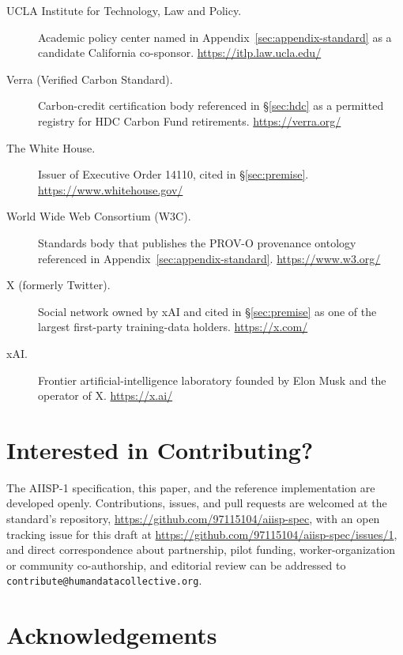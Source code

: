 \documentclass[10pt,a4paper,twocolumn]{article}
\begin{document}
\begin{description}
\item[UCLA Institute for Technology, Law and Policy.] Academic policy center named in Appendix~\ref{sec:appendix-standard} as a candidate California co-sponsor. \url{https://itlp.law.ucla.edu/}

\item[Verra (Verified Carbon Standard).] Carbon-credit certification body referenced in \S\ref{sec:hdc} as a permitted registry for HDC Carbon Fund retirements. \url{https://verra.org/}

\item[The White House.] Issuer of Executive Order 14110, cited in \S\ref{sec:premise}. \url{https://www.whitehouse.gov/}

\item[World Wide Web Consortium (W3C).] Standards body that publishes the PROV-O provenance ontology referenced in Appendix~\ref{sec:appendix-standard}. \url{https://www.w3.org/}

\item[X (formerly Twitter).] Social network owned by xAI and cited in \S\ref{sec:premise} as one of the largest first-party training-data holders. \url{https://x.com/}

\item[xAI.] Frontier artificial-intelligence laboratory founded by Elon Musk and the operator of X. \url{https://x.ai/}

\end{description}

\section*{Interested in Contributing?}

The AIISP-1 specification, this paper, and the reference implementation are developed openly. Contributions, issues, and pull requests are welcomed at the standard's repository, \url{https://github.com/97115104/aiisp-spec}, with an open tracking issue for this draft at \url{https://github.com/97115104/aiisp-spec/issues/1}, and direct correspondence about partnership, pilot funding, worker-organization or community co-authorship, and editorial review can be addressed to \texttt{contribute@humandatacollective.org}.

\onecolumn
\newpage

\section*{Acknowledgements}
\begingroup
\footnotesize
\end{document}
